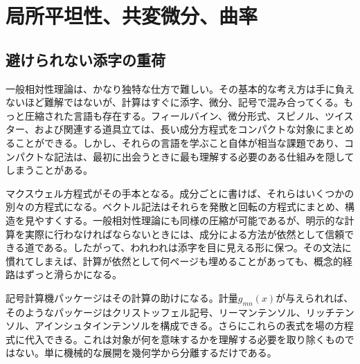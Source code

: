 \chapter{局所平坦性、共変微分、曲率}


\section{避けられない添字の重荷}

一般相対性理論は、かなり独特な仕方で難しい。その基本的な考え方は手に負えないほど難解ではないが、計算はすぐに添字、微分、記号で混み合ってくる。もっと圧縮された言語も存在する。フィールバイン、微分形式、スピノル、ツイスター、および関連する道具立ては、長い成分方程式をコンパクトな対象にまとめることができる。しかし、それらの言語を学ぶこと自体が相当な課題であり、コンパクトな記法は、最初に出会うときに最も理解する必要のある仕組みを隠してしまうことがある。

マクスウェル方程式がその手本となる。成分ごとに書けば、それらはいくつかの別々の方程式になる。ベクトル記法はそれらを発散と回転の方程式にまとめ、構造を見やすくする。一般相対性理論にも同様の圧縮が可能であるが、明示的な計算を実際に行わなければならないときには、成分による方法が依然として信頼できる道である。したがって、われわれは添字を目に見える形に保つ。その文法に慣れてしまえば、計算が依然として何ページも埋めることがあっても、概念的経路はずっと滑らかになる。

記号計算機パッケージはその計算の助けになる。計量\(g_{mn}(x)\)が与えられれば、そのようなパッケージはクリストッフェル記号、リーマンテンソル、リッチテンソル、アインシュタインテンソルを構成できる。さらにこれらの表式を場の方程式に代入できる。これは対象が何を意味するかを理解する必要を取り除くものではない。単に機械的な展開を幾何学から分離するだけである。

\begin{classroomqa}
\end{classroomqa}

